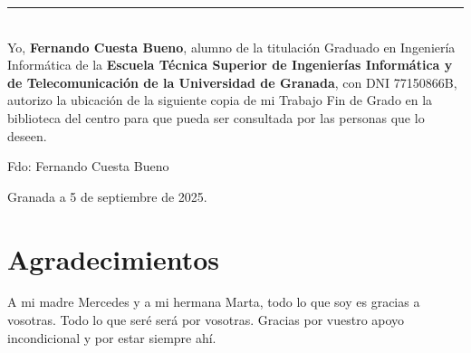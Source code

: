 \noindent\rule[-1ex]{\textwidth}{2pt}\\[4.5ex]

Yo, \textbf{Fernando Cuesta Bueno}, alumno de la titulación Graduado en Ingeniería Informática de la \textbf{Escuela Técnica Superior
       de Ingenierías Informática y de Telecomunicación de la Universidad de Granada}, con DNI 77150866B, autorizo la
ubicación de la siguiente copia de mi Trabajo Fin de Grado en la biblioteca del centro para que pueda ser
consultada por las personas que lo deseen.

\vspace{6cm}

\noindent Fdo: Fernando Cuesta Bueno

\vspace{2cm}

\begin{flushright}
       Granada a 5 de septiembre de 2025.
\end{flushright}















\chapter*{Agradecimientos}
\thispagestyle{empty}

\vspace{1cm}


A mi madre Mercedes y a mi hermana Marta, todo lo que soy es gracias a vosotras. Todo lo que seré será por vosotras. Gracias por vuestro apoyo incondicional y por estar siempre ahí.


